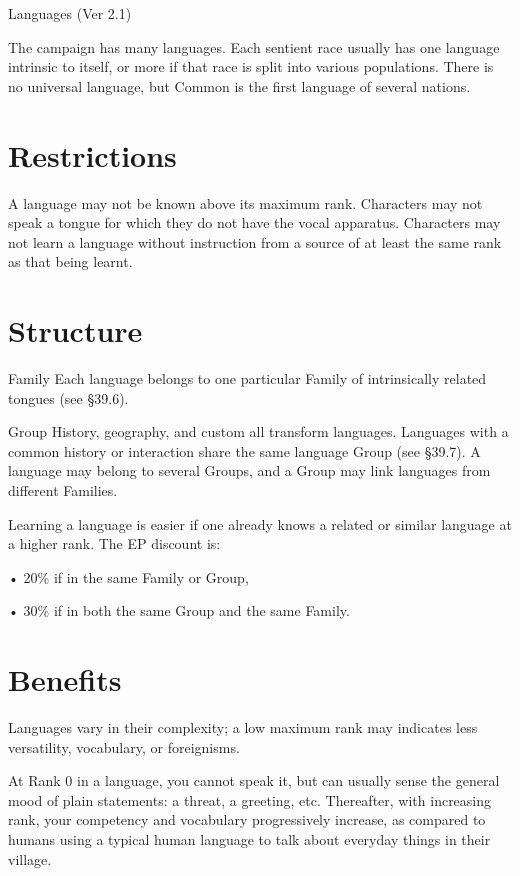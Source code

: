 \begin{Chapter}{Languages (Ver 2.1)}

The campaign has many languages.  Each sentient race usually has one
language intrinsic to itself, or more if that race is split into
various populations.  There is no universal language, but Common is
the first language of several nations.

\section{Restrictions}

A language may not be known above its maximum rank. Characters may not
speak a tongue for which they do not have the vocal apparatus.
Characters may not learn a language without instruction from a source
of at least the same rank as that being learnt.

\section{Structure}
Family Each language belongs to one particular Family of intrinsically
related tongues (see §39.6).

Group History, geography, and custom all transform languages.
Languages with a common history or interaction share the same language
Group (see §39.7). A language may belong to several Groups, and a
Group may link languages from different Families.

Learning a language is easier if one already knows a related or
similar language at a higher rank. The EP discount is:

• 20\% if in the same Family or Group,  

•  30\%  if  in  both  the  same  Group  and  the  same 
Family. 

\section{Benefits}

Languages vary in their complexity; a low maximum rank may indicates
less versatility, vocabulary, or foreignisms.

At Rank 0 in a language, you cannot speak it, but can usually sense
the general mood of plain statements: a threat, a greeting, etc.
Thereafter, with increasing rank, your competency and vocabulary
progressively increase, as compared to humans using a typical human
language to talk about everyday things in their village.


\end{Chapter}

